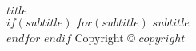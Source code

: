 \begin{titlepage}
    \centering
    \vspace*{10cm}
    {\huge \textbf{$title$}}\\[0.5cm]
    $if(subtitle)$
        $for(subtitle)$
            {\Large \textit{$subtitle$}}\\
        $endfor$
    $endif$
    \vfill
    {\small Copyright \copyright{} $copyright$}\\[0.5cm]
\end{titlepage}
